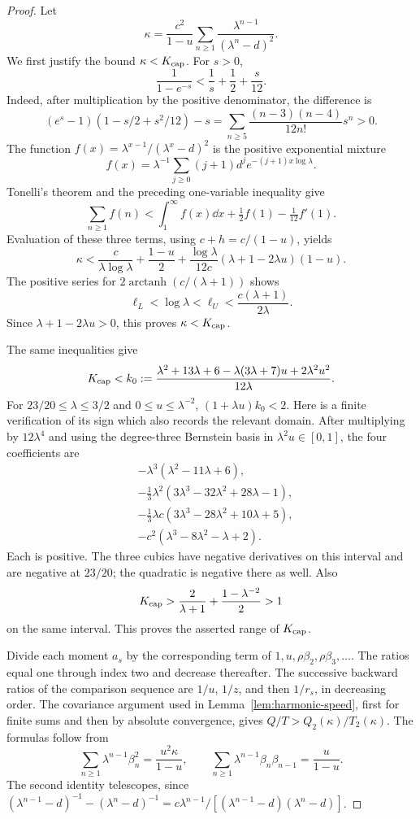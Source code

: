 \begin{proof}
Let
\[
 \kappa=\frac{c^2}{1-u}\sum_{n\ge1}
               \frac{\lambda^{n-1}}{(\lambda^n-d)^2}.
\]
We first justify the bound $\kappa<K_{\rm cap}$. For $s>0$,
\[
 \frac1{1-e^{-s}}<\frac1s+\frac12+\frac{s}{12}.
\]
Indeed, after multiplication by the positive denominator, the difference is
\[
 (e^s-1)(1-s/2+s^2/12)-s
 =\sum_{n\ge5}\frac{(n-3)(n-4)}{12n!}s^n>0.
\]
The function $f(x)=\lambda^{x-1}/(\lambda^x-d)^2$ is the positive exponential mixture
\[
 f(x)=\lambda^{-1}\sum_{j\ge0}(j+1)d^j
                    e^{-(j+1)x\log\lambda}.
\]
Tonelli's theorem and the preceding one-variable inequality give
\[
 \sum_{n\ge1}f(n)<\int_1^\infty f(x)\dd x+\tfrac12 f(1)-\tfrac1{12}f'(1).
\]
Evaluation of these three terms, using $c+h=c/(1-u)$, yields
\[
 \kappa<\frac c{\lambda\log\lambda}+\frac{1-u}{2}
 +\frac{\log\lambda}{12c}(\lambda+1-2\lambda u)(1-u).
\]
The positive series for $2\operatorname{arctanh}(c/(\lambda+1))$ shows
\[
 \ell_L<\log\lambda<\ell_U<\frac{c(\lambda+1)}{2\lambda}.
\]
Since $\lambda+1-2\lambda u>0$, this proves $\kappa<K_{\rm cap}$.

The same inequalities give
\[
 K_{\rm cap}<k_0:=
 \frac{\lambda^2+13\lambda+6-\lambda(3\lambda+7)u+2\lambda^2u^2}{12\lambda}.
\]
For $23/20\le\lambda\le3/2$ and $0\le u\le\lambda^{-2}$, $(1+\lambda u)k_0<2$. Here is a finite verification of its sign which also records the relevant domain. After multiplying by $12\lambda^4$ and using the degree-three Bernstein basis in $\lambda^2u\in[0,1]$, the four coefficients are
\[
\begin{split}
 &-\lambda^3(\lambda^2-11\lambda+6),\\
 &-\tfrac13\lambda^2(3\lambda^3-32\lambda^2+28\lambda-1),\\
 &-\tfrac13\lambda c(3\lambda^3-28\lambda^2+10\lambda+5),\\
 &-c^2(\lambda^3-8\lambda^2-\lambda+2).
\end{split}
\]
Each is positive. The three cubics have negative derivatives on this interval and are negative at $23/20$; the quadratic is negative there as well. Also
\[
 K_{\rm cap}>\frac2{\lambda+1}+\frac{1-\lambda^{-2}}2>1
\]
on the same interval. This proves the asserted range of $K_{\rm cap}$.

Divide each moment $a_s$ by the corresponding term of $1,u,\rho\beta_2,\rho\beta_3,\ldots$. The ratios equal one through index two and decrease thereafter. The successive backward ratios of the comparison sequence are $1/u$, $1/z$, and then $1/r_s$, in decreasing order. The covariance argument used in Lemma~\ref{lem:harmonic-speed}, first for finite sums and then by absolute convergence, gives $Q/T>Q_2(\kappa)/T_2(\kappa)$. The formulas follow from
\[
 \sum_{n\ge1}\lambda^{n-1}\beta_n^2=\frac{u^2\kappa}{1-u},
 \qquad \sum_{n\ge1}\lambda^{n-1}\beta_n\beta_{n-1}=\frac u{1-u}.
\]
The second identity telescopes, since
$(\lambda^{n-1}-d)^{-1}-(\lambda^n-d)^{-1}
=c\lambda^{n-1}/[(\lambda^{n-1}-d)(\lambda^n-d)]$.


\end{proof}
